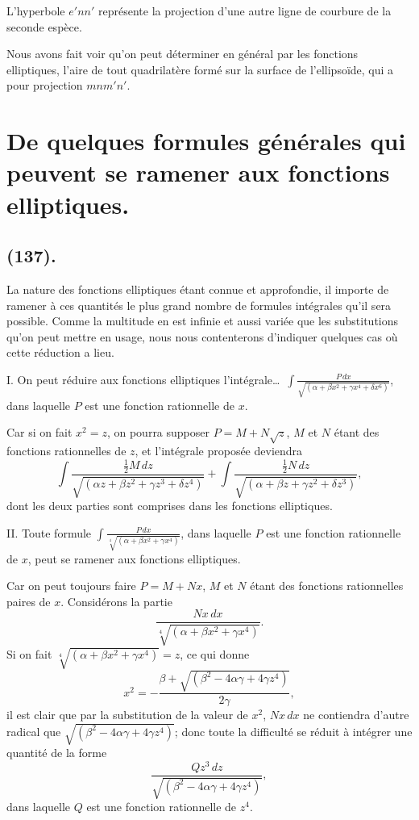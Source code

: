 \documentclass{article}
\begin{document}
L'hyperbole $e'nn'$ représente la projection d'une autre ligne de courbure de la seconde espèce.

Nous avons fait voir qu'on peut déterminer en général par les fonctions elliptiques, l'aire de tout quadrilatère formé sur la surface de l'ellipsoïde, qui a pour projection $mnm'n'$.

\section*{De quelques formules générales qui peuvent se ramener aux fonctions elliptiques.}

\subsection*{(137).}

La nature des fonctions elliptiques étant connue et approfondie, il importe de ramener à ces quantités le plus grand nombre de formules intégrales qu'il sera possible. Comme la multitude en est infinie et aussi variée que les substitutions qu'on peut mettre en usage, nous nous contenterons d'indiquer quelques cas où cette réduction a lieu.

I. On peut réduire aux fonctions elliptiques l'intégrale\ldots\ $\displaystyle\int\frac{P\,dx}{\sqrt{(\alpha+\beta x^{2}+\gamma x^{4}+\delta x^{6})}}$, dans laquelle $P$ est une fonction rationnelle de $x$.

Car si on fait $x^{2}=z$, on pourra supposer $P=M+N\sqrt{z}$, $M$ et $N$ étant des fonctions rationnelles de $z$, et l'intégrale proposée deviendra
\[ \int\frac{\tfrac{1}{2}M\,dz}{\sqrt{(\alpha z+\beta z^{2}+\gamma z^{3}+\delta z^{4})}}+\int\frac{\tfrac{1}{2}N\,dz}{\sqrt{(\alpha+\beta z+\gamma z^{2}+\delta z^{3})}}, \]
dont les deux parties sont comprises dans les fonctions elliptiques.

II. Toute formule $\displaystyle\int\frac{P\,dx}{\sqrt[4]{(\alpha+\beta x^{2}+\gamma x^{4})}}$, dans laquelle $P$ est une fonction rationnelle de $x$, peut se ramener aux fonctions elliptiques.

Car on peut toujours faire $P=M+Nx$, $M$ et $N$ étant des fonctions rationnelles paires de $x$. Considérons la partie
\[ \frac{Nx\,dx}{\sqrt[4]{(\alpha+\beta x^{2}+\gamma x^{4})}}. \]
Si on fait $\sqrt[4]{(\alpha+\beta x^{2}+\gamma x^{4})}=z$, ce qui donne
\[ x^{2}=-\frac{\beta+\sqrt{(\beta^{2}-4\alpha\gamma+4\gamma z^{4})}}{2\gamma}, \]
il est clair que par la substitution de la valeur de $x^{2}$, $Nx\,dx$ ne contiendra d'autre radical que $\sqrt{(\beta^{2}-4\alpha\gamma+4\gamma z^{4})}$; donc toute la difficulté se réduit à intégrer une quantité de la forme
\[ \frac{Qz^{3}\,dz}{\sqrt{(\beta^{2}-4\alpha\gamma+4\gamma z^{4})}}, \]
dans laquelle $Q$ est une fonction rationnelle de $z^{4}$.
\end{document}
